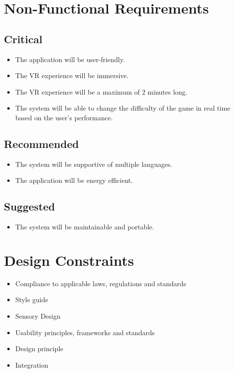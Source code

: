 \section{Non-Functional Requirements}
    \subsection{Critical}
        \begin{itemize}
            \item The application will be user-friendly.
            \item The VR experience will be immersive.
            \item The VR experience will be a maximum of 2 minutes long.
            \item The system will be able to change the difficulty of the game in real time based on the user's performance.
        \end{itemize}
    \subsection{Recommended}
        \begin{itemize}
            \item The system will be supportive of multiple languages.
            \item The application will be energy efficient.
        \end{itemize}
    \subsection{Suggested}
        \begin{itemize}
            \item The system will be maintainable and portable.
        \end{itemize}
\section{Design Constraints}
\begin{itemize}
\item 	Compliance to applicable laws, regulations and standards
\item 	Style guide
\item 	Sensory Design
\item 	Usability principles, frameworks and standards
\item 	Design principle
\item 	Integration
\end{itemize}
     
     